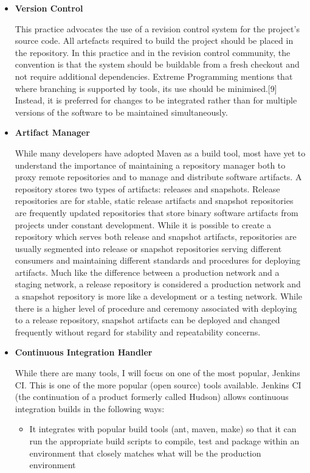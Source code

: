 \documentclass[12pt,a4paper,oneside]{report}
\begin{document}
\begin{itemize}
\item \textbf{Version Control}

\par This practice advocates the use of a revision control system for the project's source code. All artefacts required to build the project should be placed in the repository. In this practice and in the revision control community, the convention is that the system should be buildable from a fresh checkout and not require additional dependencies.  Extreme Programming  mentions that where branching is supported by tools, its use should be minimised.[9] Instead, it is preferred for changes to be integrated rather than for multiple versions of the software to be maintained simultaneously. 
\item \textbf{Artifact Manager}
\par 
While many developers have adopted Maven as a build tool, most have yet to understand the importance of maintaining a repository manager both to proxy remote repositories and to manage and distribute software artifacts. A repository stores two types of artifacts: releases and snapshots. Release repositories are for stable, static release artifacts and snapshot repositories are frequently updated repositories that store binary software artifacts from projects under constant development. While it is possible to create a repository which serves both release and snapshot artifacts, repositories are usually segmented into release or snapshot repositories serving different consumers and maintaining different standards and procedures for deploying artifacts. Much like the difference between a production network and a staging network, a release repository is considered a production network and a snapshot repository is more like a development or a testing network. While there is a higher level of procedure and ceremony associated with deploying to a release repository, snapshot artifacts can be deployed and changed frequently without regard for stability and repeatability concerns.
\item \textbf{Continuous Integration Handler}
\par While there are many tools, I will focus on one of the most popular, Jenkins CI. This is one of the more popular (open source) tools available. Jenkins CI (the continuation of a product formerly called Hudson) allows continuous integration builds in the following ways:
\begin{itemize}
\item It integrates with popular build tools (ant, maven, make) so that it can run the appropriate build scripts to compile, test and package within an environment that closely matches what will be the production environment

\end{itemize}
\end{itemize}
\end{document}
